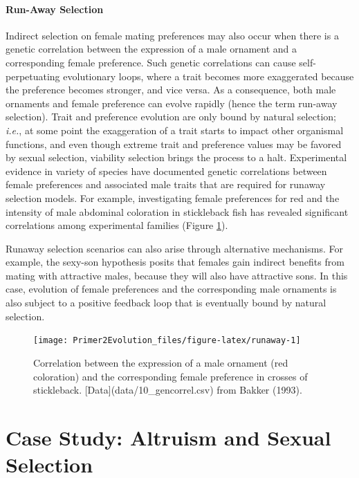 \documentclass[
]{book}
\begin{document}
\hypertarget{run-away-selection}{%
\paragraph*{Run-Away Selection}\label{run-away-selection}}

Indirect selection on female mating preferences may also occur when there is a genetic correlation between the expression of a male ornament and a corresponding female preference. Such genetic correlations can cause self-perpetuating evolutionary loops, where a trait becomes more exaggerated because the preference becomes stronger, and vice versa. As a consequence, both male ornaments and female preference can evolve rapidly (hence the term run-away selection). Trait and preference evolution are only bound by natural selection; \emph{i.e.}, at some point the exaggeration of a trait starts to impact other organismal functions, and even though extreme trait and preference values may be favored by sexual selection, viability selection brings the process to a halt. Experimental evidence in variety of species have documented genetic correlations between female preferences and associated male traits that are required for runaway selection models. For example, investigating female preferences for red and the intensity of male abdominal coloration in stickleback fish has revealed significant correlations among experimental families (Figure \ref{fig:runaway}).

Runaway selection scenarios can also arise through alternative mechanisms. For example, the sexy-son hypothesis posits that females gain indirect benefits from mating with attractive males, because they will also have attractive sons. In this case, evolution of female preferences and the corresponding male ornaments is also subject to a positive feedback loop that is eventually bound by natural selection.

\begin{figure}
\texttt{[image: Primer2Evolution\_files/figure-latex/runaway-1]} \caption{Correlation between the expression of a male ornament (red coloration) and the corresponding female preference in crosses of stickleback. [Data](data/10_gencorrel.csv) from Bakker (1993).}\label{fig:runaway}
\end{figure}

\hypertarget{case-study-altruism-and-sexual-selection}{%
\section{Case Study: Altruism and Sexual Selection}\label{case-study-altruism-and-sexual-selection}}
\end{document}
